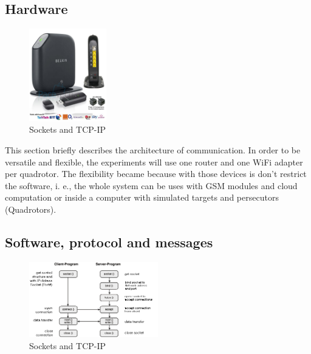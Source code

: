 \subsection{Hardware}
\begin{figure}
	\includegraphics[width=0.3\textwidth]{../Images/c2/hardware_comm.jpg}
	\caption{Sockets and TCP-IP}
	\label{fig:socketstcpip}
\end{figure}

This section briefly describes the architecture of communication. In order to be versatile and flexible, the experiments will use one router and one WiFi adapter per quadrotor. The flexibility became because with those devices is don't restrict the software, i. e., the whole system can be uses with GSM modules and cloud computation or inside a computer with simulated targets and persecutors (Quadrotors).



\subsection{Software, protocol and messages}

\begin{figure}[h]
	\begin{center}
		\includegraphics[width=0.5\textwidth, natwidth=448, natheight=263]{../Images/c2/socketstcpip.png}
	\end{center}
	\caption{Sockets and TCP-IP}
	\label{fig:socketstcpip}
\end{figure}

